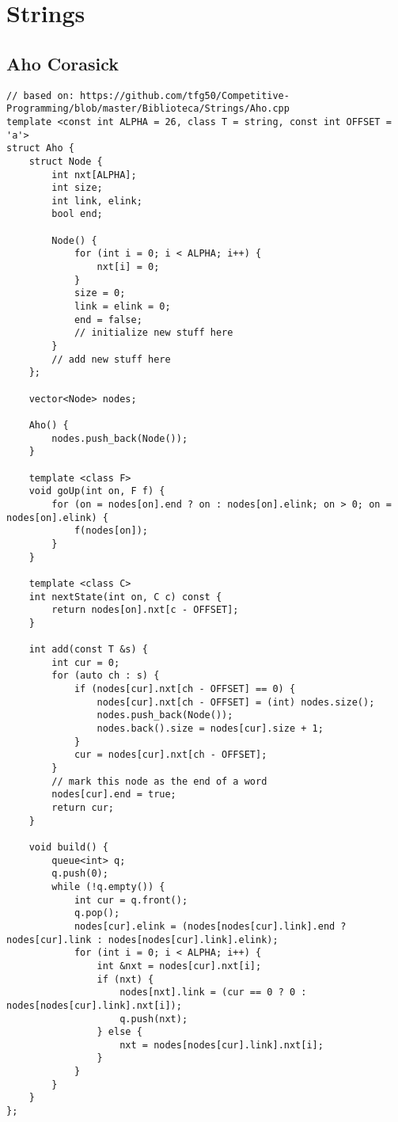 \documentclass[12pt, a4paper, twoside]{article}
\begin{document}
%
%

\section{Strings}

\subsection{Aho Corasick
}
\begin{lstlisting}
// based on: https://github.com/tfg50/Competitive-Programming/blob/master/Biblioteca/Strings/Aho.cpp
template <const int ALPHA = 26, class T = string, const int OFFSET = 'a'>
struct Aho {
	struct Node {
		int nxt[ALPHA];
		int size;
		int link, elink;
		bool end;

		Node() {
			for (int i = 0; i < ALPHA; i++) {
				nxt[i] = 0;
			}
			size = 0;
			link = elink = 0;
			end = false;
			// initialize new stuff here
		}
		// add new stuff here
	};

	vector<Node> nodes;

	Aho() {
		nodes.push_back(Node());
	}

	template <class F>
	void goUp(int on, F f) {
		for (on = nodes[on].end ? on : nodes[on].elink; on > 0; on = nodes[on].elink) {
			f(nodes[on]);
		}
	}

	template <class C>
	int nextState(int on, C c) const {
		return nodes[on].nxt[c - OFFSET];
	}

	int add(const T &s) {
		int cur = 0;
		for (auto ch : s) {
			if (nodes[cur].nxt[ch - OFFSET] == 0) {
				nodes[cur].nxt[ch - OFFSET] = (int) nodes.size();
				nodes.push_back(Node());
				nodes.back().size = nodes[cur].size + 1;
			}
			cur = nodes[cur].nxt[ch - OFFSET];
		}
		// mark this node as the end of a word
		nodes[cur].end = true;
		return cur;
	}

	void build() {
		queue<int> q;
		q.push(0);
		while (!q.empty()) {
			int cur = q.front();
			q.pop();
			nodes[cur].elink = (nodes[nodes[cur].link].end ? nodes[cur].link : nodes[nodes[cur].link].elink);
			for (int i = 0; i < ALPHA; i++) {
				int &nxt = nodes[cur].nxt[i];
				if (nxt) {
					nodes[nxt].link = (cur == 0 ? 0 : nodes[nodes[cur].link].nxt[i]);
					q.push(nxt);
				} else {
					nxt = nodes[nodes[cur].link].nxt[i];
				}
			}
		}
	}
};
\end{lstlisting}
\end{document}

